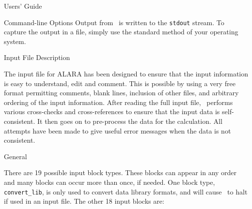 \begin{chapter}{Users' Guide\label{app:user.guide}}
\begin{section}{Command-line Options}
    Output from \ALARA\ is written to the \texttt{stdout} stream.  To
    capture the output in a file, simply use the standard method of
    your operating system.
    
  \end{section}
  
  
  \begin{section}{Input File Description\label{app:user.input}}
    
    The input file for ALARA has been designed to ensure that the
    input information is easy to understand, edit and comment.  This
    is possible by using a very free format permitting comments, blank
    lines, inclusion of other files, and arbitrary ordering of the
    input information.  After reading the full input file, \ALARA\ 
    performs various cross-checks and cross-references to ensure that
    the input data is self-consistent.  It then goes on to pre-process
    the data for the calculation.  All attempts have been made to give
    useful error messages when the data is not consistent.

    \begin{subsection}{General}
    
      There are 19 possible input block types.  These blocks can
      appear in any order and many blocks can occur more than once, if
      needed.  One block type, \texttt{convert\_lib}, is only used to
      convert data library formats, and will cause \ALARA\ to halt if
      used in an input file.  The other 18 input blocks are:


\end{subsection}
\end{section}
\end{chapter}
